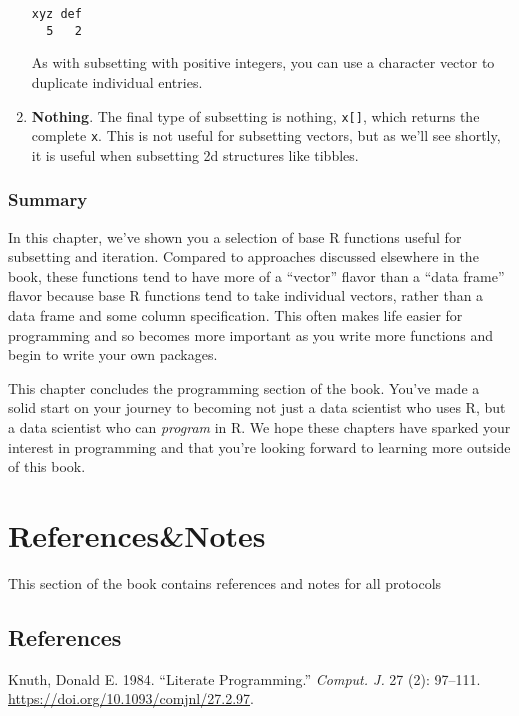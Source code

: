 \documentclass[
  letterpaper,
  DIV=11,
  numbers=noendperiod]{scrreprt}
\newlength{\cslhangindent}
\newlength{\cslentryspacingunit} %
\newenvironment{CSLReferences}[2] %
 {%
  \setlength{\parindent}{0pt}
  \ifodd #1
  \let\oldpar\par
  \def\par{\hangindent=\cslhangindent\oldpar}
  \fi
  \setlength{\parskip}{#2\cslentryspacingunit}
 }%
 {}
\begin{document}
\begin{enumerate}
\begin{verbatim}
xyz def 
  5   2 
\end{verbatim}

  As with subsetting with positive integers, you can use a character
  vector to duplicate individual entries.
\item
  \textbf{Nothing}. The final type of subsetting is nothing,
  \texttt{x{[}{]}}, which returns the complete \texttt{x}. This is not
  useful for subsetting vectors, but as we'll see shortly, it is useful
  when subsetting 2d structures like tibbles.
\end{enumerate}

\hypertarget{summary}{%
\section{Summary}\label{summary}}

In this chapter, we've shown you a selection of base R functions useful
for subsetting and iteration. Compared to approaches discussed elsewhere
in the book, these functions tend to have more of a ``vector'' flavor
than a ``data frame'' flavor because base R functions tend to take
individual vectors, rather than a data frame and some column
specification. This often makes life easier for programming and so
becomes more important as you write more functions and begin to write
your own packages.

This chapter concludes the programming section of the book. You've made
a solid start on your journey to becoming not just a data scientist who
uses R, but a data scientist who can \emph{program} in R. We hope these
chapters have sparked your interest in programming and that you're
looking forward to learning more outside of this book.

\part{References\&Notes}

This section of the book contains references and notes for all protocols

\hypertarget{references}{%
\chapter*{References}\label{references}}


\hypertarget{refs}{}
\begin{CSLReferences}{1}{0}
\leavevmode{}%
Knuth, Donald E. 1984. {``Literate Programming.''} \emph{Comput. J.} 27
(2): 97--111. \url{https://doi.org/10.1093/comjnl/27.2.97}.

\end{CSLReferences}
\end{document}
